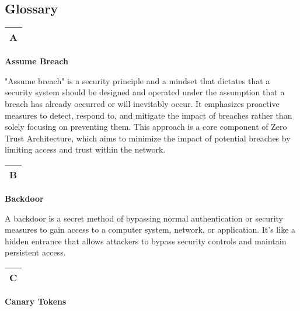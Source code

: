 \subsection{\textbf{Glossary}}

\begin{table}
\justifying

\begin{tabular}{l}
\textbf{A} \\
\hline

\end{tabular}

\end{table}

\textbf{Assume Breach}

"Assume breach" is a security principle and a mindset that dictates that a security system should be designed and operated under the assumption that a breach has already occurred or will inevitably occur. It emphasizes proactive measures to detect, respond to, and mitigate the impact of breaches rather than solely focusing on preventing them. This approach is a core component of Zero Trust Architecture, which aims to minimize the impact of potential breaches by limiting access and trust within the network.

\begin{table}
\justifying

\begin{tabular}{l}
\textbf{B} \\
\hline

\end{tabular}

\end{table}

\textbf{Backdoor}

A backdoor is a secret method of bypassing normal authentication or security measures to gain access to a computer system, network, or application. It's like a hidden entrance that allows attackers to bypass security controls and maintain persistent access.

\begin{table}
\justifying

\begin{tabular}{l}
\textbf{C} \\
\hline

\end{tabular}

\end{table}

\textbf{Canary Tokens}

